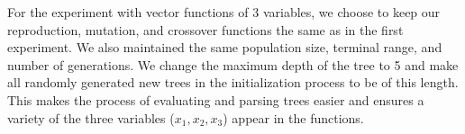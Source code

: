 For the experiment with vector functions of 3 variables, we choose to keep our reproduction, mutation, and crossover functions the same as in the first experiment. We also maintained the same population size, terminal range, and number of generations. We change the maximum depth of the tree to 5 and make all randomly generated new trees in the initialization process to be of this length. This makes the process of evaluating and parsing trees easier and ensures a variety of the three variables ($x_1, x_2, x_3$) appear in the functions.







